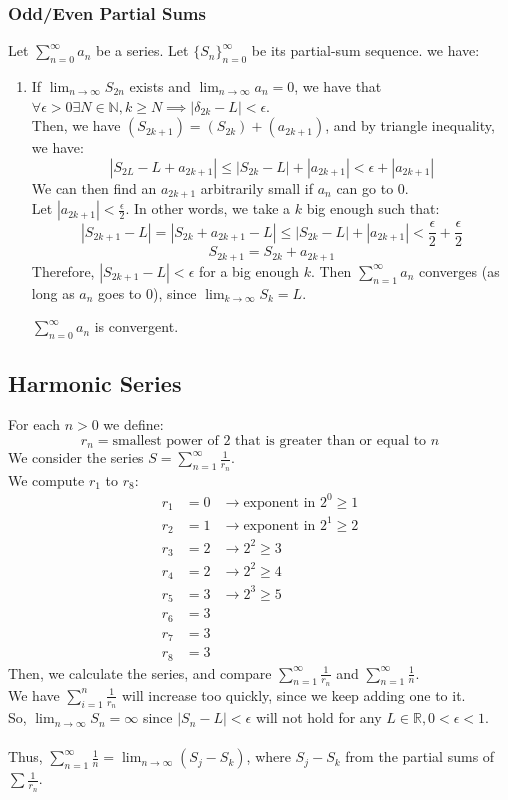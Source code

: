 \documentclass{article}
\begin{document}
\subsubsection{Odd/Even Partial Sums}
Let $\sum_{n=0}^\infty a_n$ be a series. Let $\{S_n\}_{n=0}^\infty$ be its partial-sum sequence. we have:
\begin{enumerate}
    \item If $\lim_{n\to\infty} S_{2n}$ exists and $\lim_{n\to\infty}a_n = 0$, we have that $\forall \epsilon > 0 \exists N \in \mathbb{N}, k \geq N \implies |\delta_{2k} - L| < \epsilon$.\\
    Then, we have $(S_{2k+1}) = (S_{2k}) + (a_{2k+1})$, and by triangle inequality, we have:
    $$|S_{2L} - L + a_{2k+1}| \leq |S_{2k} - L| + |a_{2k+1}| < \epsilon + |a_{2k+1}|$$
    We can then find an $a_{2k+1}$ arbitrarily small if $a_n$ can go to 0.\\
    Let $|a_{2k+1}| < \frac{\epsilon}{2}$. In other words, we take a $k$ big enough such that:
    $$|S_{2k+1} - L| = |S_{2k} + a_{2k+1} - L| \leq |S_{2k} - L| + |a_{2k+1}| < \frac{\epsilon}{2} + \frac{\epsilon}{2}$$
    $$S_{2k+1} = S_{2k} + a_{2k+1}$$
    Therefore, $|S_{2k+1} - L| < \epsilon$ for a big enough $k$. Then $\sum_{n=1}^\infty a_n$ converges (as long as $a_n$ goes to 0), since $\lim_{k\to\infty} S_k = L$.
    
    $\sum_{n=0}^\infty a_n$ is convergent.
\end{enumerate}

\subsection{Harmonic Series}
For each $n > 0$ we define:
$$r_n = \text{smallest power of 2 that is greater than or equal to }n$$
We consider the series $S = \sum_{n=1}^\infty \frac{1}{r_n}$.\\
We compute $r_1$ to $r_8$:
\begin{align*}
    r_1 & = 0 & \rightarrow \text{exponent in } 2^0 \geq 1\\
    r_2 & = 1 & \rightarrow \text{exponent in }2^1 \geq 2\\
    r_3 & = 2 & \rightarrow 2^2 \geq 3\\
    r_4 & = 2 & \rightarrow 2^2 \geq 4\\
    r_5 & = 3 & \rightarrow 2^3 \geq 5\\
    r_6 & = 3\\
    r_7 & = 3\\
    r_8 & = 3
\end{align*}
Then, we calculate the series, and compare $\sum_{n=1}^\infty \frac{1}{r_n}$ and $\sum_{n=1}^\infty \frac{1}{n}$.\\
We have $\sum_{i=1}^n \frac{1}{r_n}$ will increase too quickly, since we keep adding one to it.\\
So, $\lim_{n\to\infty} S_n = \infty$ since $|S_n - L| < \epsilon$ will not hold for any $L \in \mathbb{R}, 0 < \epsilon < 1$.\\
\\
Thus, $\sum_{n=1}^\infty \frac{1}{n} = \lim_{n\to\infty}(S_j - S_k)$, where $S_j - S_k$ from the partial sums of $\sum \frac{1}{r_n}$.
\end{document}
